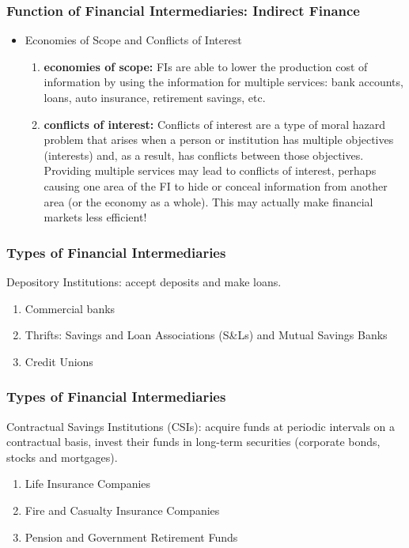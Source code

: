 \documentclass{beamer}
\begin{document}
\begin{frame}
\frametitle{Function of Financial Intermediaries: Indirect Finance }
\begin{itemize}
\item Economies of Scope and Conflicts of Interest

\begin{enumerate}
\item \textbf{economies of scope:} FIs are able to lower the production cost of information by using the information for multiple services: bank accounts, loans, auto insurance, retirement savings, etc. 

\item \textbf{conflicts of interest:}
Conflicts of interest are a type of moral hazard problem that arises when a person
or institution has multiple objectives (interests) and, as a result, has conflicts
between those objectives. \\
 Providing multiple services may lead to conflicts of interest, perhaps causing one area of the FI to hide or conceal information from another area (or the economy as a whole). This may actually make financial markets less efficient!


\end{enumerate}


\end{itemize}
\end{frame}






\begin{frame}
\frametitle{Types of Financial Intermediaries}
Depository Institutions: accept deposits and make loans.
\begin{enumerate}
\item Commercial banks 
\item Thrifts: Savings and Loan Associations (S\&Ls) and Mutual Savings Banks
\item Credit Unions 
\end{enumerate}

\end{frame}

\begin{frame}
\frametitle{Types of Financial Intermediaries}
Contractual Savings Institutions (CSIs): acquire funds at periodic intervals on a contractual basis, invest their funds in long-term securities (corporate bonds, stocks and mortgages).
\begin{enumerate}
\item Life Insurance Companies 
\item Fire and Casualty Insurance Companies 
\item Pension and Government Retirement Funds 
\end{enumerate}

\end{frame}
\end{document}
